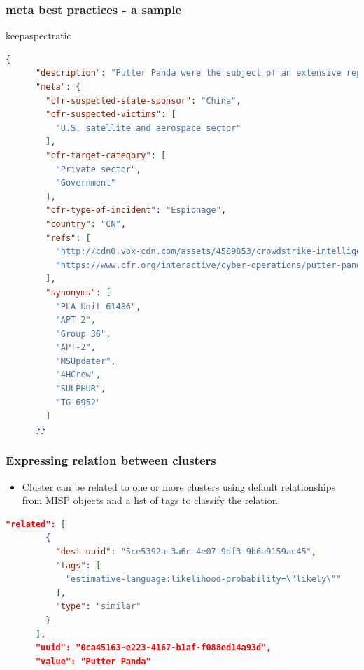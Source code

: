 \begin{frame}[fragile]
        \frametitle{meta best practices - a sample}
        \begin{adjustbox}{keepaspectratio}
          \begin{lstlisting}[language=json,firstnumber=1]
 {
      "description": "Putter Panda were the subject of an extensive report by CrowdStrike, which stated: 'The CrowdStrike Intelligence team has been tracking this particular unit since2012, under the codename PUTTER PANDA, and has documented activity dating back to 2007. The report identifies Chen Ping, aka cpyy, and the primary location of Unit 61486.'",
      "meta": {
        "cfr-suspected-state-sponsor": "China",
        "cfr-suspected-victims": [
          "U.S. satellite and aerospace sector"
        ],
        "cfr-target-category": [
          "Private sector",
          "Government"
        ],
        "cfr-type-of-incident": "Espionage",
        "country": "CN",
        "refs": [
          "http://cdn0.vox-cdn.com/assets/4589853/crowdstrike-intelligence-report-putter-panda.original.pdf",
          "https://www.cfr.org/interactive/cyber-operations/putter-panda"
        ],
        "synonyms": [
          "PLA Unit 61486",
          "APT 2",
          "Group 36",
          "APT-2",
          "MSUpdater",
          "4HCrew",
          "SULPHUR",
          "TG-6952"
        ]
      }}
          \end{lstlisting}
          \end{adjustbox}
\end{frame}

\begin{frame}[fragile]
        \frametitle{Expressing relation between clusters}
        \begin{itemize}
                \item Cluster can be related to one or more clusters using default relationships from MISP objects and a list of tags to classify the relation.
        \end{itemize}

        \begin{lstlisting}[language=json,firstnumber=1]
        "related": [
        {
          "dest-uuid": "5ce5392a-3a6c-4e07-9df3-9b6a9159ac45",
          "tags": [
            "estimative-language:likelihood-probability=\"likely\""
          ],
          "type": "similar"
        }
      ],
      "uuid": "0ca45163-e223-4167-b1af-f088ed14a93d",
      "value": "Putter Panda"
        \end{lstlisting}
\end{frame}




